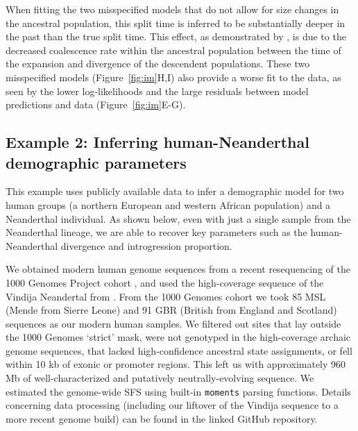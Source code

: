 \documentclass[]{article}
\newcommand{\moments}{\texttt{moments}\xspace}
\begin{document}
When fitting the two misspecified models that do not allow for size changes in
the ancestral population, this split time is inferred to be substantially
deeper in the past than the true split time. This effect, as demonstrated by
\citet{momigliano2021biases}, is due to the decreased coalescence rate within
the ancestral population between the time of the expansion and divergence of
the descendent populations. These two misspecified models
(Figure~\ref{fig:im}H,I) also provide a worse fit to the data, as seen by the
lower log-likelihoods and the large residuals between model predictions and
data (Figure~\ref{fig:im}E-G).

\subsection*{Example 2: Inferring human-Neanderthal demographic parameters}

This example uses publicly available data to infer a demographic model for two
human groups (a northern European and western African population) and a
Neanderthal individual. As shown below, even with just a single sample from the
Neanderthal lineage, we are able to recover key parameters such as the
human-Neanderthal divergence and introgression proportion.

We obtained modern human genome sequences from a recent resequencing of the 
1000 Genomes Project cohort \citep{byrska2022high}, and used the high-coverage 
sequence of the Vindija Neandertal from \cite{prufer2017high}. 
From the 1000 Genomes cohort we took 85 MSL (Mende from Sierre Leone) and 91 
GBR (British from England and Scotland) sequences as our modern human samples.  
We filtered out sites that lay outside the 1000 Genomes `strict' mask, 
were not genotyped in the high-coverage archaic genome sequences, 
that lacked high-confidence ancestral state assignments, or fell within 10 kb of 
exonic or promoter regions. This left us with approximately 960 Mb of 
well-characterized and putatively neutrally-evolving sequence.
We estimated the genome-wide SFS using built-in \moments parsing functions.
Details concerning data processing (including our liftover of the Vindija 
sequence to a more recent genome build) can be found in the linked GitHub 
repository.
\end{document}
